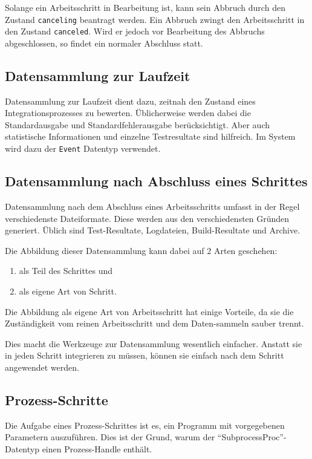 Solange ein Arbeitsschritt in Bearbeitung ist, kann sein Abbruch
durch den Zustand \verb|canceling| beantragt werden.
Ein Abbruch zwingt den Arbeitsschritt in den Zustand \verb|canceled|.
Wird er jedoch vor Bearbeitung des Abbruchs abgeschlossen,
so findet ein normaler Abschluss statt.

\subsection{Datensammlung zur Laufzeit}

Datensammlung zur Laufzeit dient dazu, zeitnah den Zustand eines Integrationsprozesses zu bewerten.
Üblicherweise werden dabei die Standardausgabe und Standardfehlerausgabe berücksichtigt. Aber auch statistische Informationen und einzelne Testresultate sind hilfreich. Im System wird dazu der \verb|Event| Datentyp verwendet.

\subsection{Datensammlung nach Abschluss eines Schrittes}

Datensammlung nach dem Abschluss eines Arbeitsschritts
umfasst in der Regel verschiedenste Dateiformate.
Diese werden aus den verschiedensten Gründen generiert.
Üblich sind Test-Resultate, Logdateien, Build-Resultate und Archive.

Die Abbildung dieser Datensammlung kann dabei auf 2 Arten geschehen:

\begin{enumerate}
    \item als Teil des Schrittes und
    \item als eigene Art von Schritt.
\end{enumerate}

Die Abbildung als eigene Art von Arbeitsschritt hat einige Vorteile,
da sie die Zuständigkeit vom reinen Arbeitsschritt und dem Daten-sammeln sauber trennt.

Dies macht die Werkzeuge zur Datensammlung wesentlich einfacher.
Anstatt sie in jeden Schritt integrieren zu müssen,
können sie einfach nach dem Schritt angewendet werden.

\subsection{Prozess-Schritte}

Die Aufgabe eines Prozess-Schrittes ist es,
ein Programm mit vorgegebenen Parametern auszuführen.
Dies ist der Grund, warum der ``SubprocessProc''-Datentyp einen
Prozess-Handle enthält.

